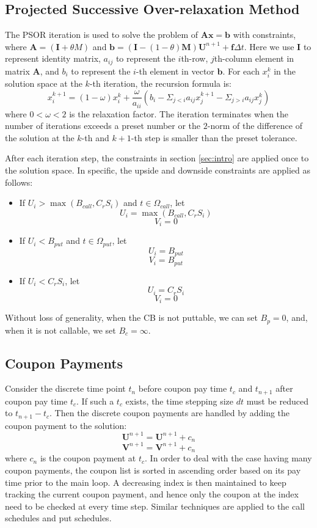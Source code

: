 \documentclass[12pt]{article}
\begin{document}
\subsection{Projected Successive Over-relaxation Method}
The PSOR iteration is used to solve the problem of $\mathbf{Ax} = \mathbf{b}$ with constraints, where $\mathbf{A} = (\mathbf{I} + \theta M)$ and $ \mathbf{b} = (\mathbf{I} - (1-\theta)\mathbf{M})\mathbf{U}^{n+1} + \mathbf{f}\Delta t$. Here we use $\mathbf{I}$ to represent identity matrix, $a_{ij}$ to represent the $i$th-row, $j$th-column element in matrix $\mathbf{A}$, and $b_i$ to represent the $i$-th element in vector $\mathbf{b}$. For each $x^k_i$ in the solution space at the $k$-th iteration, the recursion formula is:
\begin{equation}
x_i^{k+1} = (1-\omega)x_i^{k} + \frac{\omega}{a_{ii}}(b_i - \Sigma_{j < i} a_{ij}x_{j}^{k+1} - \Sigma_{j > i}a_{ij}x_j^{k})
\end{equation}
where $0< \omega < 2$ is the relaxation factor. The iteration terminates when the number of iterations exceeds a preset number or the $2$-norm of the difference of the solution at the $k$-th and $k+1$-th step is smaller than the preset tolerance.

After each iteration step, the constraints in section \ref{sec:intro} are applied once to the solution space. In specific, the upside and downside constraints are applied as follows:
\begin{itemize}
\item
If $U_i > \max(B_{call}, C_rS_i)$ and $t\in \Omega_{call}$, let
\[U_i = \max(B_{call}, C_rS_i)\]
\[V_i = 0\]
\item
If $U_i < B_{put}$ and $t\in \Omega_{put}$, let
\[U_i = B_{put}\]
\[V_i = B_{put}\]
\item
If $U_i < C_rS_i$, let
\[U_i = C_rS_i\]
\[V_i = 0\]
\end{itemize}
Without loss of generality, when the CB is not puttable, we can set $B_p = 0$, and, when it is not callable, we set $B_c = \infty$. 

\subsection{Coupon Payments}
Consider the discrete time point $t_n$ before coupon pay time $t_c$ and $t_{n+1}$ after coupon pay time $t_c$. If such a $t_c$ exists, the time stepping size $dt$ must be reduced to $t_{n+1} - t_c$. Then the discrete coupon payments are handled by adding the coupon payment to the solution:
\[\mathbf{U}^{n+1} = \mathbf{U}^{n+1} + c_n\] 
\[\mathbf{V}^{n+1} = \mathbf{V}^{n+1} + c_n\]
where $c_n$ is the coupon payment at $t_c$. In order to deal with the case having many coupon payments, the coupon list is sorted in ascending order based on its pay time prior to the main loop. A decreasing index is then maintained to keep tracking the current coupon payment, and hence only the coupon at the index need to be checked at every time step. Similar techniques are applied to the call schedules and put schedules.
\end{document}
